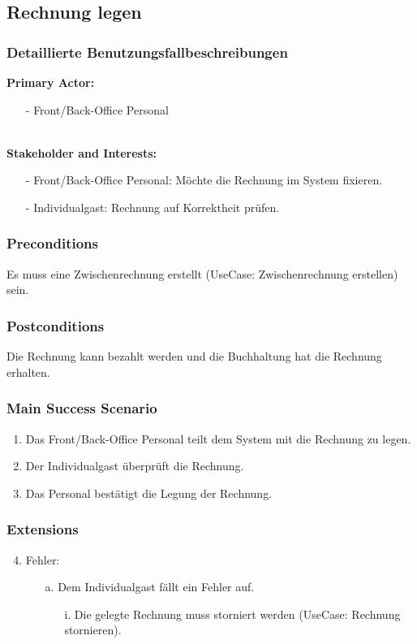 \documentclass[./detailed_overview_usecases.tex]{subfiles}
\begin{document}
    \subsection{Rechnung legen}
    \subsubsection{Detaillierte Benutzungsfallbeschreibungen}
    \textbf{Primary Actor: }
    \begin{itemize}
        \item [-] Front/Back-Office Personal
    \end{itemize}
    \\
    \textbf{Stakeholder and Interests:}
    \begin{itemize}
        \item[-] Front/Back-Office Personal: Möchte die Rechnung im System fixieren.
		\item[-] Individualgast: Rechnung auf Korrektheit prüfen.
    \end{itemize}

    \subsubsection*{Preconditions}
    Es muss eine Zwischenrechnung erstellt (UseCase: Zwischenrechnung erstellen) sein.

    \subsubsection*{Postconditions}
    Die Rechnung kann bezahlt werden und die Buchhaltung hat die Rechnung erhalten.

    \subsubsection*{Main Success Scenario}
    \begin{enumerate}
        \item Das Front/Back-Office Personal teilt dem System mit die Rechnung zu legen.
        \item Der Individualgast überprüft die Rechnung.
        \item Das Personal bestätigt die Legung der Rechnung.
    \end{enumerate}

    \subsubsection*{Extensions}
    \begin{enumerate}
        \setcounter{enumi}{3}
        \item Fehler:
        \begin{itemize}
            \item[a.] Dem Individualgast fällt ein Fehler auf.
            \begin{itemize}
                \item[i.] Die gelegte Rechnung muss storniert werden (UseCase: Rechnung stornieren).
            \end{itemize}
        \end{itemize}
    \end{enumerate}
\end{document}
